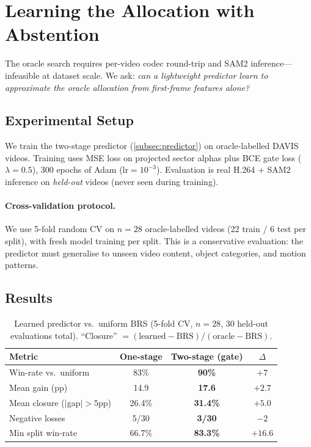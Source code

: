 \section{Learning the Allocation with Abstention}
\label{sec:learning}

The oracle search requires per-video codec round-trip and SAM2 inference---infeasible at dataset scale.
We ask: \emph{can a lightweight predictor learn to approximate the oracle allocation from first-frame features alone?}

\subsection{Experimental Setup}

We train the two-stage predictor (\cref{subsec:predictor}) on oracle-labelled DAVIS videos.
Training uses MSE loss on projected sector alphas plus BCE gate loss ($\lambda{=}0.5$), 300 epochs of Adam ($\mathrm{lr}{=}10^{-3}$).
Evaluation is real H.264 + SAM2 inference on \emph{held-out} videos (never seen during training).

\paragraph{Cross-validation protocol.}
We use 5-fold random CV on $n{=}28$ oracle-labelled videos (22 train / 6 test per split), with fresh model training per split.
This is a conservative evaluation: the predictor must generalise to unseen video content, object categories, and motion patterns.

\subsection{Results}

\begin{table}[t]
\centering
\small
\caption{Learned predictor vs.\ uniform BRS (5-fold CV, $n{=}28$, 30 held-out evaluations total). ``Closure'' $= (\text{learned} - \text{BRS}) / (\text{oracle} - \text{BRS})$.}
\label{tab:predictor}
\begin{tabular}{lccc}
\toprule
\textbf{Metric} & \textbf{One-stage} & \textbf{Two-stage (gate)} & \textbf{$\Delta$} \\
\midrule
Win-rate vs.\ uniform    & 83\%  & \textbf{90\%}  & $+7$ \\
Mean gain (pp)           & 14.9  & \textbf{17.6}  & $+2.7$ \\
Mean closure ($|$gap$|{>}5$pp) & 26.4\% & \textbf{31.4\%} & $+5.0$ \\
Negative losses          & 5/30  & \textbf{3/30}  & $-2$ \\
Min split win-rate       & 66.7\% & \textbf{83.3\%} & $+16.6$ \\
\bottomrule
\end{tabular}
\end{table}

